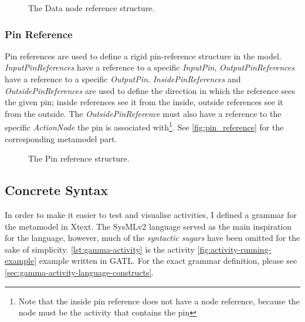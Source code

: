 \begin{figure}[!ht]
	\centering
	
	\caption{The Data node reference structure.}
	\label{fig:data_source_target_reference_example}
\end{figure}

\subsubsection*{Pin Reference}

Pin references are used to define a rigid pin-reference structure in the model. \emph{InputPinReferences} have a reference to a specific \emph{InputPin}, \emph{OutputPinReferences} have a reference to a specific \emph{OutputPin}. \emph{InsidePinReferences} and \emph{OutsidePinReferences} are used to define the direction in which the reference sees the given pin; inside references see it from the inside, outside references see it from the outside. The \emph{OutsidePinReference} must also have a reference to the specific \emph{ActionNode} the pin is associated with\footnote{Note that the inside pin reference does not have a node reference, because the node must be the activity that contains the pin}. See \autoref{fig:pin_reference} for the corresponding metamodel part.

\begin{figure}[!ht]
	\centering
	
	\caption{The Pin reference structure.}
	\label{fig:pin_reference}
\end{figure}

\subsection{Concrete Syntax}

In order to make it easier to test and visualise activities, I defined a grammar for the metamodel in Xtext. The SysMLv2 language served as the main inspiration for the language, however, much of the \emph{syntactic sugars} have been omitted for the sake of simplicity. \autoref{lst:gamma-activity} is the activity \autoref{fig:activity-running-example} example written in GATL. For the exact grammar definition, please see \autoref{sec:gamma-activity-language-constructs}.

